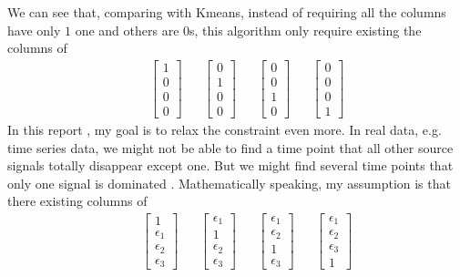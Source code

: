 \documentclass[14pt]{book}
\begin{document}
We can see that, comparing with Kmeans, instead of requiring all the columns have only $1$ one and others are $0$s, this algorithm only require existing the columns of 
\begin{equation}
\begin{aligned}
& &\begin{bmatrix}
1\\ 
0\\ 
0\\ 
0
\end{bmatrix}
& & \begin{bmatrix}
0\\ 
1\\ 
0\\ 
0
\end{bmatrix}
& & \begin{bmatrix}
0\\ 
0\\ 
1\\ 
0
\end{bmatrix}
& & \begin{bmatrix}
0\\ 
0\\ 
0\\ 
1
\end{bmatrix}
\end{aligned}
\end{equation}
In this report , my goal is to relax the constraint even more. In real data, e.g. time series data, we might not be able to find a time point that all other source signals totally disappear except one.  But we might find several time points that only one signal is dominated . Mathematically speaking, my assumption is that there existing columns of 
\begin{equation}
\begin{aligned}
& &\begin{bmatrix}
1\\ 
\epsilon_1\\ 
\epsilon_2\\ 
\epsilon_3
\end{bmatrix}
& & \begin{bmatrix}
\epsilon_1\\ 
1\\ 
\epsilon_2\\ 
\epsilon_3
\end{bmatrix}
& & \begin{bmatrix}
\epsilon_1\\ 
\epsilon_2\\ 
1\\ 
\epsilon_3
\end{bmatrix}
& & \begin{bmatrix}
\epsilon_1\\ 
\epsilon_2\\ 
\epsilon_3\\ 
1
\end{bmatrix}
\end{aligned}
\end{equation}
\setcounter{chapter}{2}
\setcounter{equation}{0} %
\end{document}
